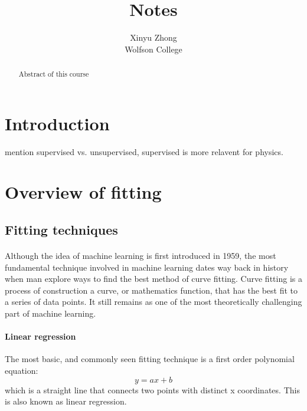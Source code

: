\documentclass[12pt,a4paper]{article}
\author{Xinyu Zhong\\Wolfson College}
\title{Notes}
\begin{document}
\begin{titlepage}
    \maketitle
\end{titlepage}

\tableofcontents

\newpage

\begin{abstract}
\noindent
Abstract of this course
\end{abstract}
\section{Introduction}
mention supervised vs. unsupervised, supervised is more relavent for physics.
\section{Overview of fitting}
\subsection{Fitting techniques}
\paragraph*{}
Although the idea of machine learning is first introduced in 1959,
the most fundamental technique involved in machine learning dates way back in history when man explore ways to find the best method of curve fitting.
Curve fitting is a process of construction a curve, or mathematics function, that has the best fit to a series of data points. It still remains as one of the most theoretically challenging part of machine learning.
\paragraph{Linear regression}
The most basic, and commonly seen fitting technique is a first order polynomial equation:
\begin{equation}
    y=ax+b
\end{equation}
which is a straight line that connects two points with distinct x coordinates. This is also known as linear regression.
\end{document}
